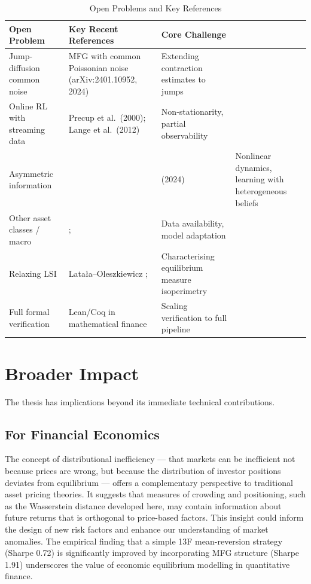 \begin{table}[ht]
\centering
\small
\caption{Open Problems and Key References}
\label{tab:syn-open-problems}
\begin{tabular}{p{2.3cm}p{3.5cm}p{5cm}}
\toprule
\textbf{Open Problem} & \textbf{Key Recent References} & \textbf{Core Challenge} \\
\midrule
Jump-diffusion common noise & MFG with common Poissonian noise
    (arXiv:2401.10952, 2024) & Extending contraction estimates to jumps \\
\addlinespace
Online RL with streaming data & Precup et al.\ (2000); Lange et al.\ (2012) &
    Non-stationarity, partial observability \\
\addlinespace
Asymmetric information & \citep{incompleteinfomfg2024,zengetal2024} &
    (2024) & Nonlinear dynamics, learning with heterogeneous beliefs \\
\addlinespace
Other asset classes / macro & \citep{jaimungalnourian2015}; \citep{macromfg2025}
    & Data availability, model adaptation \\
\addlinespace
Relaxing LSI & Lata\l a--Oleszkiewicz \citep{latalaoleszkiewicz2022}; \citep{tamingisoperimetry2025} & Characterising equilibrium measure isoperimetry \\
\addlinespace
Full formal verification & Lean/Coq in mathematical finance & Scaling
    verification to full pipeline \\
\bottomrule
\end{tabular}
\end{table}


\section{Broader Impact}
\label{sec:syn-impact}

The thesis has implications beyond its immediate technical contributions.

\subsection{For Financial Economics}

The concept of distributional inefficiency --- that markets can be inefficient
not because prices are wrong, but because the distribution of investor positions
deviates from equilibrium --- offers a complementary perspective to traditional
asset pricing theories. It suggests that measures of crowding and positioning,
such as the Wasserstein distance developed here, may contain information about
future returns that is orthogonal to price-based factors. This insight could
inform the design of new risk factors and enhance our understanding of market
anomalies. The empirical finding that a simple 13F mean-reversion strategy
(Sharpe 0.72) is significantly improved by incorporating MFG structure (Sharpe
1.91) underscores the value of economic equilibrium modelling in quantitative
finance.

